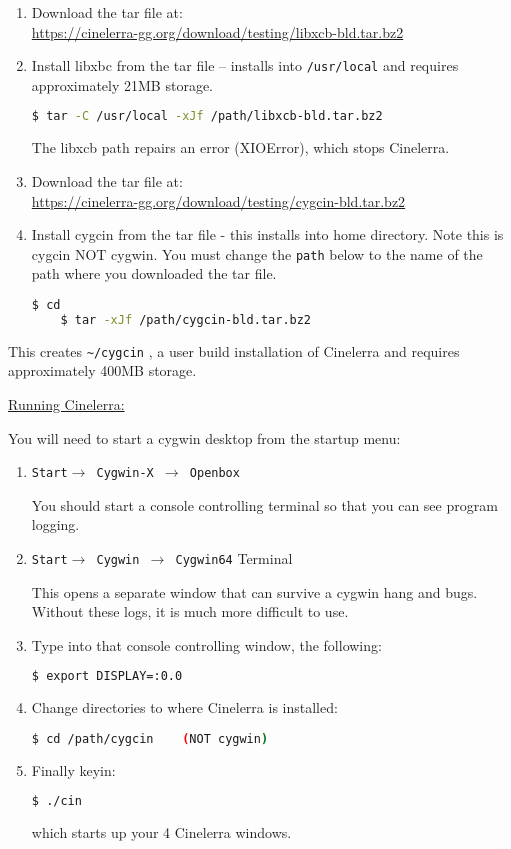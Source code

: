 \begin{enumerate}
	\item Download the tar file at:\\
	 {\small \url{https://cinelerra-gg.org/download/testing/libxcb-bld.tar.bz2}}
	\item Install libxbc from the tar file -- installs into \texttt{/usr/local} and requires approximately 21MB storage.
\begin{lstlisting}[language=bash,numbers=none]
	$ tar -C /usr/local -xJf /path/libxcb-bld.tar.bz2
\end{lstlisting}
The libxcb path repairs an error (XIOError), which stops Cinelerra.
	\item Download the tar file at:\\
	{\small \url{https://cinelerra-gg.org/download/testing/cygcin-bld.tar.bz2}}	
	\item Install cygcin from the tar file - this installs into home directory.  Note this is cygcin NOT cygwin. You must change the \texttt{path} below to the name of the path where you downloaded the tar file.
\begin{lstlisting}[language=bash,numbers=none]
	$ cd
	$ tar -xJf /path/cygcin-bld.tar.bz2
\end{lstlisting}
\end{enumerate}
This creates \texttt{\~{}/cygcin} , a user build installation of Cinelerra and requires approximately 400MB storage.

\underline{Running Cinelerra:}

You will need to start a cygwin desktop from the startup menu:
\begin{enumerate}
	\item \texttt{Start$\rightarrow$ Cygwin-X $\rightarrow$ Openbox}

You should start a console controlling terminal so that you can see program logging.
	\item \texttt{Start$\rightarrow$ Cygwin $\rightarrow$ Cygwin64} Terminal

This opens a separate window that can survive a cygwin hang and bugs. Without these logs, it is much more difficult to use.

	\item Type into that console controlling window, the following:
\begin{lstlisting}[language=bash,numbers=none]
	$ export DISPLAY=:0.0
\end{lstlisting}
	\item Change directories to where Cinelerra is installed:
\begin{lstlisting}[language=bash,numbers=none]
	$ cd /path/cygcin    (NOT cygwin)
\end{lstlisting}
	\item Finally keyin:
\begin{lstlisting}[language=bash,numbers=none]
	$ ./cin
\end{lstlisting}
which starts up your 4 Cinelerra windows.
\end{enumerate}

